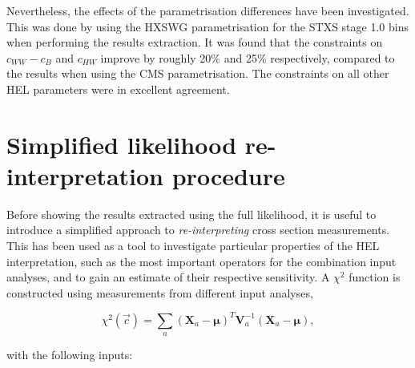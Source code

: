Nevertheless, the effects of the parametrisation differences have been investigated. This was done by using the HXSWG parametrisation for the STXS stage 1.0 bins when performing the results extraction. It was found that the constraints on $c_{WW}-c_B$ and $c_{HW}$ improve by roughly 20\% and 25\% respectively, compared to the results when using the CMS parametrisation. The constraints on all other HEL parameters were in excellent agreement.

\section{Simplified likelihood re-interpretation procedure}\label{sec:eft_simplified}
Before showing the results extracted using the full likelihood, it is useful to introduce a simplified approach to \textit{re-interpreting} cross section measurements. This has been used as a tool to investigate particular properties of the HEL interpretation, such as the most important operators for the combination input analyses, and to gain an estimate of their respective sensitivity. A $\chi^2$ function is constructed using measurements from different input analyses,

\begin{equation}
    \chi^2(\vec{c}) = \sum_a (\mathbf{X}_a-\pmb{\mu})^T \mathbf{V}_a^{-1} (\mathbf{X}_a-\pmb{\mu}),
\end{equation}

\noindent
with the following inputs:


